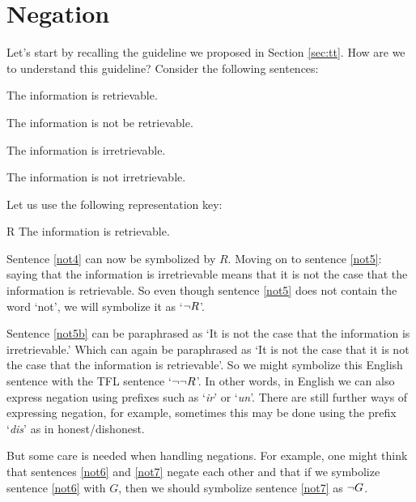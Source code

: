 
\section{Negation}
Let's start by recalling the guideline we proposed in Section \ref{sec:tt}.
How are we to understand this guideline? Consider the following sentences:
 \begin{earg}
		\item[\ex{not4}] The information is retrievable.
		\item[\ex{not4b}] The information is not be retrievable.
		\item[\ex{not5}] The information is irretrievable.
		\item[\ex{not5b}] The information is not irretrievable.
	\end{earg}
Let us use the following representation key:
	\begin{ekey}
		\item[R] The information is retrievable.
	\end{ekey}
Sentence \ref{not4} can now be symbolized by $R$. Moving on to sentence \ref{not5}: saying that the information is irretrievable means that it is not the case that the information is retrievable. So even though sentence \ref{not5} does not contain the word `not', we will symbolize it as `$\neg R$'.

Sentence \ref{not5b} can be paraphrased as `It is not the case that the information is irretrievable.' Which can again be paraphrased as `It is not the case that it is not the case that the information is retrievable'. So we might symbolize this English sentence with the TFL sentence `$\neg\neg R$'. In other words, in English we can also express negation using prefixes such as `\emph{ir}' or `\emph{un}'. There are still further ways of expressing negation, for example, sometimes this may be done using  the prefix `\emph{dis}' as in honest/dishonest.

But some care is needed when handling negations. For example, one might think that sentences \ref{not6} and \ref{not7} negate each other and that if we symbolize sentence \ref{not6} with $G$, then we should symbolize sentence  \ref{not7} as $\neg G$.

